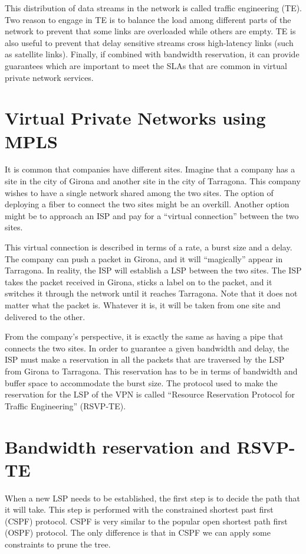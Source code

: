 This distribution of data streams in the network is called traffic engineering (TE).
Two reason to engage in TE is to balance the load among different parts of the network to prevent that some links are overloaded while others are empty.
TE is also useful to prevent that delay sensitive streams cross high-latency links (such as satellite links).
Finally, if combined with bandwidth reservation, it can provide guarantees which are important to meet the SLAs that are common in virtual private network services.

\section{Virtual Private Networks using MPLS}
It is common that companies have different sites.
Imagine that a company has a site in the city of Girona and another site in the city of Tarragona.
This company wishes to have a single network shared among the two sites.
The option of deploying a fiber to connect the two sites might be an overkill.
Another option might be to approach an ISP and pay for a ``virtual connection'' between the two sites.

This virtual connection is described in terms of a rate, a burst size and a delay.
The company can push a packet in Girona, and it will ``magically'' appear in Tarragona.
In reality, the ISP will establish a LSP between the two sites.
The ISP takes the packet received in Girona, sticks a label on to the packet, and it switches it through the network until it reaches Tarragona.
Note that it does not matter what the packet is.
Whatever it is, it will be taken from one site and delivered to the other.

From the company's perspective, it is exactly the same as having a pipe that connects the two sites.
In order to guarantee a given bandwidth and delay, the ISP must make a reservation in all the packets that are traversed by the LSP from Girona to Tarragona.
This reservation has to be in terms of bandwidth and buffer space to accommodate the burst size.
The protocol used to make the reservation for the LSP of the VPN is called ``Resource Reservation Protocol for Traffic Engineering'' (RSVP-TE).


\section{Bandwidth reservation and RSVP-TE}
When a new LSP needs to be established, the first step is to decide the path that it will take.
This step is performed with the constrained shortest past first (CSPF) protocol.
CSPF is very similar to the popular open shortest path first (OSPF) protocol.
The only difference is that in CSPF we can apply some constraints to prune the tree.

